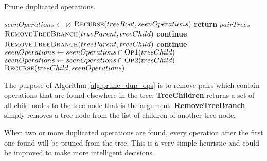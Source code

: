\documentclass[12pt,a4paper,onecolumn,twoside,openright]{report}
\begin{document}
\begin{algorithm}[H]
	\caption{Prune duplicated operations.} \label{alg:prune_dup_ops}
	\small
	\begin{algorithmic}
			\State $seenOperations \gets \varnothing$
			\State $\Call{Recurse}{treeRoot, seenOperations}$
		\EndFor
		\State \textbf{return} $pairTrees$
	\EndFunction
	\\
				\State $\Call{RemoveTreeBranch}{treeParent, treeChild}$
				\State \textbf{continue}
				\State $\Call{RemoveTreeBranch}{treeParent, treeChild}$
				\State \textbf{continue}
			\Else
				\State $seenOperations \gets seenOperations \cap \Call{Op1}{treeChild}$
				\State $seenOperations \gets seenOperations \cap \Call{Op2}{treeChild}$	
				\State $\Call{Recurse}{treeChild, seenOperations}$
			\EndIf
		\EndFor
	\EndFunction
	\end{algorithmic}
\end{algorithm}
The purpose of Algorithm \ref{alg:prune_dup_ops} is to remove pairs which contain operations that are found elsewhere in the tree. \textbf{TreeChildren} returns a set of all child nodes to the tree node that is the argument. \textbf{RemoveTreeBranch} simply removes a tree node from the list of children of another tree node.

When two or more duplicated operations are found, every operation after the first one found will be pruned from the tree. This is a very simple heuristic and could be improved to make more intelligent decisions.
\\
\end{document}
